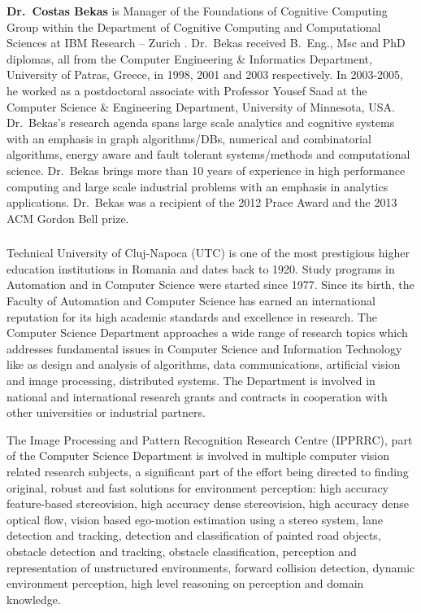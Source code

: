 {\bf Dr.~Costas Bekas} is Manager of the Foundations of Cognitive Computing Group within the Department of Cognitive Computing and Computational Sciences at IBM Research -- Zurich . Dr.\ Bekas
received B.\ Eng., Msc and PhD diplomas, all from the Computer Engineering \&
Informatics Department, University of Patras, Greece, in 1998, 2001 and
2003 respectively. In 2003-2005, he worked as a postdoctoral associate with
Professor Yousef Saad at the Computer Science \& Engineering Department,
University of Minnesota, USA. Dr.\ Bekas's research agenda
spans large scale analytics and cognitive systems with an emphasis in graph algorithms/DBs,
numerical and combinatorial algorithms, energy aware and fault tolerant
systems/methods and computational science. Dr.\ Bekas brings more than 10
years of experience in high performance computing and large scale industrial
problems with an emphasis in analytics applications. Dr.\ Bekas was a
recipient of the 2012 Prace Award and the 2013 ACM Gordon Bell prize.


\subsubsection{\CLUJ}


Technical University of Cluj-Napoca (UTC) is one of the most prestigious higher education institutions in Romania and dates back to 1920. Study programs in Automation and in Computer Science were started since 1977. Since its birth, the Faculty of Automation and Computer Science has earned an international reputation for its high academic standards and excellence in research. The Computer Science Department approaches a wide range of research topics which addresses fundamental issues in Computer Science and Information Technology like as design and analysis of algorithms, data communications, artificial vision and image processing, distributed systems. The Department is involved in national and international research grants and contracts in cooperation with other universities or industrial partners.

The Image Processing and Pattern Recognition Research Centre (IPPRRC), part of the Computer Science Department is involved in multiple computer vision related research subjects, a significant part of the effort being directed to finding original, robust and fast solutions for environment perception: high accuracy feature-based stereovision, high accuracy dense stereovision, high accuracy dense optical flow, vision based ego-motion estimation using a stereo system, lane detection and tracking, detection and classification of painted road objects, obstacle detection and tracking, obstacle classification, perception and representation of unstructured environments, forward collision detection, dynamic environment perception, high level reasoning on perception and domain knowledge.

